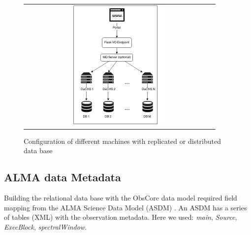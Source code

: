 \documentclass[]{spie}
\begin{document}
\begin{figure}
   \begin{center}
   \begin{tabular}{c}
   \includegraphics[width=0.5\textwidth]{images/interaccion.png}
   \end{tabular}
   \end{center}
   \caption[example]
   { \label{fig:dachs} Configuration of different machines with replicated or distributed data base}
\end{figure}

\subsection{ALMA data Metadata}
Building the relational data base with the ObsCore data model required field
mapping from the ALMA Science Data Model (ASDM) \cite{viallefond2009sdm}.  An
ASDM has a series of tables (XML) with the observation metadata. Here we used:
\emph{main}, \emph{Source}, \emph{ExecBlock}, \emph{spectralWindow}.
\end{document}
